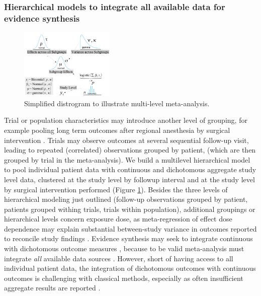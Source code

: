\documentclass[11pt,notitlepage]{article}
\begin{document}
\subsubsection*{Hierarchical models to integrate all available data for evidence synthesis}

\begin{figure} 
\includegraphics[width=0.4\textwidth]{Figures/DistrogramMetaAnalysis.pdf} 
\caption{\footnotesize Simplified distrogram to illustrate multi-level meta-analysis.}
\label{fig:MetaAnalysis}
\end{figure}

Trial or population characteristics may introduce another level of grouping, for example pooling long term outcomes after regional anesthesia by surgical intervention \cite{Andreae2013,Abroug2011}. Trials may observe outcomes at several sequential follow-up visit, leading to repeated (correlated) observations grouped by patient, (which are then grouped by trial in the  meta-analysis).  We build a multilevel hierarchical model to pool individual patient data with continuous and dichotomous aggregate study level data, clustered at the study level by followup interval and at the study level by surgical intervention performed (Figure \ref{fig:MetaAnalysis}). Besides the three levels of hierarchical modeling just outlined (follow-up observations grouped by patient, patients grouped withing trials, trials within population), additional groupings or hierarchical levels concern exposure dose, as meta-regression of effect dose dependence may explain substantial between-study variance in outcomes reported to reconcile study findings \cite{Andreae2015}. Evidence synthesis may seek to integrate continuous with dichotomous outcome measures \cite{AndreaeJohnsonAbstract2013}, because to be valid meta-analysis must integrate \textit{all} available data sources \cite{Deeks2011chapter}. However, short of having access to all individual patient data, the integration of dichotomous outcomes with continuous outcomes is challenging with classical methods\cite{Andreae2015}, especially as often insufficient aggregate results are reported \cite{Roth2015CriticalCare}. 
\end{document}
